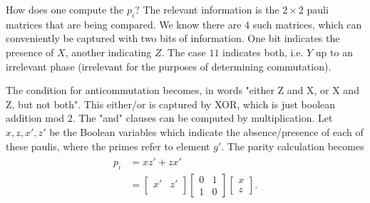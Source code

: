 \documentclass{book}
\begin{document}
    How does one compute the $p_i$? The relevant information is the $2\times 2$ pauli matrices that are being compared. We know there are $4$ such matrices, which can conveniently be captured with two bits of information. One bit indicates the presence of $X$, another indicating $Z$. The case $11$ indicates both, i.e. $Y$ up to an irrelevant phase (irrelevant for the purposes of determining commutation). 
    
    The condition for anticommutation becomes, in words "either Z and X, or X and Z, but not both". This either/or is captured by XOR, which is just boolean addition mod 2. The "and" clauses can be computed by multiplication. Let $x, z, x', z'$ be the Boolean variables which indicate the absence/presence of each of these paulis, where the primes refer to element $g'$. The parity calculation becomes
    \begin{align}
    \begin{aligned}
        p_i &= x z' + z x' \\[1.5ex]
        &= \begin{bmatrix}
            x' & z' \\
        \end{bmatrix} \begin{bmatrix}
            0 & 1 \\
            1 & 0
        \end{bmatrix} \begin{bmatrix}
            x \\
            z
        \end{bmatrix}.
    \end{aligned}
    \end{align}
    
\end{document}
